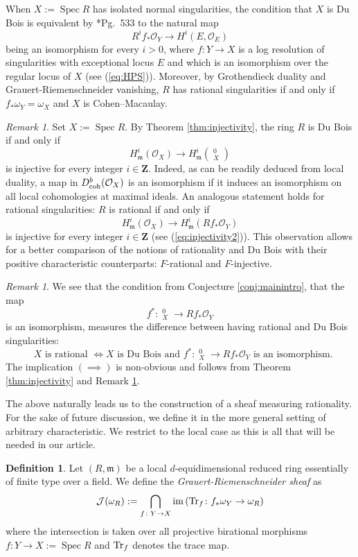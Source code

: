 \documentclass[letterpaper,11pt]{amsart}
\DeclareMathOperator{\DDB}{\underline{\Omega}}
\theoremstyle{plain}
\theoremstyle{definition}
\newtheorem{defi}[thm]{Definition}
\theoremstyle{remark}
\newtheorem{rmk}[thm]{Remark}
\def\Z{{\mathbf Z}}
\def\cO{\mathcal{O}}
\def\J{\mathcal{J}}
\def\m{\mathfrak{m}} %
\DeclareMathOperator{\Spec} {Spec}
\begin{document}
When $X := \Spec R$ has isolated normal singularities, the condition that $X$ is Du Bois is equivalent by \cite{SteenbrinkDB}*{Pg.\ 533} to the natural map
\[
R^if_*\cO_Y \to H^i(E, \cO_E)
\]
being an isomorphism for every $i > 0$, where $f \colon Y \to X$ is a log resolution of singularities with exceptional locus $E$ and which is an isomorphism over the regular locus of $X$ (see (\ref{eq:HPS})). Moreover, by Grothendieck duality and Grauert-Riemenschneider vanishing, $R$ has rational singularities if and only if $f_*\omega_Y = \omega_X$ and $X$ is Cohen--Macaulay.
\begin{rmk} \label{rmk:DuBoisLC}
Set $X := \Spec R$. By Theorem \ref{thm:injectivity}, the ring $R$ is Du Bois if and only if
\[
H^i_\m(\cO_X) \to H^i_\m(\DDB^0_X)
\]
is injective for every integer $i \in \Z$. Indeed, as can be readily deduced from local duality, a map in $D^b_{\rm coh}(\cO_X)$ is an isomorphism if it induces an isomorphism on all local cohomologies at maximal ideals. An analogous statement holds for rational singularities: $R$ is rational if and only if
\begin{equation} \label{eq:remRational}
H^i_\m(\cO_X) \to H^i_\m(Rf_*\cO_Y)
\end{equation}
is injective for every integer $i \in \Z$ (see (\ref{eq:injectivity2})). This observation allows for a better comparison of the notions of rationality and Du Bois with their positive characteristic counterparts: $F$-rational and $F$-injective.
\end{rmk}

\begin{rmk} \label{rmk:MeasureDiffRatDuBois}
We see that the condition from Conjecture \ref{conj:mainintro}, that the map
\[
f^*\colon \DDB^0_X \to Rf_*\cO_Y
\]
is an isomorphism, measures the difference between having rational and Du Bois singularities:
\[
\text{ $X$ is rational } \iff \text{$X$ is Du Bois and $f^*\colon \DDB^0_X \to Rf_*\cO_Y$ is an isomorphism.}
\]
The implication $(\implies)$ is non-obvious and follows from Theorem \ref{thm:injectivity} and Remark \ref{rmk:DuBoisLC}.
\end{rmk}

The above naturally leads us to the construction of a sheaf measuring rationality. For the sake of future discussion, we define it in the more general setting   of arbitrary characteristic. We restrict to the local case as this is all that will be needed in our article.
\begin{defi} \label{def:GR}
Let $(R,\m)$ be a local $d$-equidimensional reduced ring essentially of finite type over a field. We define the \emph{Grauert-Riemenschneider sheaf} as
\[
\J(\omega_R) := \bigcap_{f \colon Y \to X} {\rm im}\left({\rm Tr}_f \colon f_*\omega_Y \to \omega_R\right) 
\]
where the intersection is taken over all projective birational morphisms $f \colon Y \to X := \Spec R$ and ${\rm Tr}_f$ denotes the trace map.
\end{defi}
\end{document}
